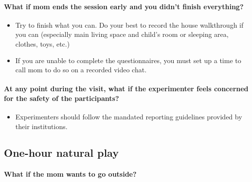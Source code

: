 \documentclass[
  12pt,
]{book}
\providecommand{\tightlist}{%
  \setlength{\itemsep}{0pt}\setlength{\parskip}{0pt}}
\begin{document}
\hypertarget{what-if-mom-ends-the-session-early-and-you-didnt-finish-everything}{%
\paragraph*{What if mom ends the session early and you didn't finish everything?}\label{what-if-mom-ends-the-session-early-and-you-didnt-finish-everything}}

\begin{itemize}
\tightlist
\item
  Try to finish what you can. Do your best to record the house walkthrough if you can (especially main living space and child's room or sleeping area, clothes, toys, etc.)
\item
  If you are unable to complete the questionnaires, you must set up a time to call mom to do so on a recorded video chat.
\end{itemize}

\hypertarget{at-any-point-during-the-visit-what-if-the-experimenter-feels-concerned-for-the-safety-of-the-participants}{%
\paragraph*{At any point during the visit, what if the experimenter feels concerned for the safety of the participants?}\label{at-any-point-during-the-visit-what-if-the-experimenter-feels-concerned-for-the-safety-of-the-participants}}

\begin{itemize}
\tightlist
\item
  Experimenters should follow the mandated reporting guidelines provided by their institutions.
\end{itemize}

\hypertarget{one-hour-natural-play}{%
\subsection{One-hour natural play}\label{one-hour-natural-play}}

\hypertarget{what-if-the-mom-wants-to-go-outside}{%
\paragraph*{What if the mom wants to go outside?}\label{what-if-the-mom-wants-to-go-outside}}
\end{document}
